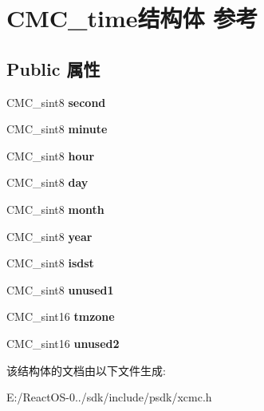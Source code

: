 \hypertarget{struct_c_m_c__time}{}\section{C\+M\+C\+\_\+time结构体 参考}
\label{struct_c_m_c__time}
\subsection*{Public 属性}
\begin{DoxyCompactItemize}
\item 
\mbox{\label{struct_c_m_c__time_a3b2881d4b17c154fc42d52ad544f2dbe}} 
C\+M\+C\+\_\+sint8 {\bfseries second}
\item 
\mbox{\label{struct_c_m_c__time_a6565d5de6fb130d1ce5793fbc7c0c451}} 
C\+M\+C\+\_\+sint8 {\bfseries minute}
\item 
\mbox{\label{struct_c_m_c__time_a098f3dc4fba997bd1a786d8249bf8774}} 
C\+M\+C\+\_\+sint8 {\bfseries hour}
\item 
\mbox{\label{struct_c_m_c__time_ae93122512c4fcf030e975e47f082e62d}} 
C\+M\+C\+\_\+sint8 {\bfseries day}
\item 
\mbox{\label{struct_c_m_c__time_a7c3c6499632a626b59a305f48db71efd}} 
C\+M\+C\+\_\+sint8 {\bfseries month}
\item 
\mbox{\label{struct_c_m_c__time_a14fb02641a97c118ffb8f1c591fadfb8}} 
C\+M\+C\+\_\+sint8 {\bfseries year}
\item 
\mbox{\label{struct_c_m_c__time_abfc7924bc699a87cbfff6e31bb81a106}} 
C\+M\+C\+\_\+sint8 {\bfseries isdst}
\item 
\mbox{\label{struct_c_m_c__time_a2220e30210638fc98f50ec4b8d29954f}} 
C\+M\+C\+\_\+sint8 {\bfseries unused1}
\item 
\mbox{\label{struct_c_m_c__time_af6abde3623adea219dcb306d7aaa271c}} 
C\+M\+C\+\_\+sint16 {\bfseries tmzone}
\item 
\mbox{\label{struct_c_m_c__time_a07f98196c3c727f4413de302b5ba8fdb}} 
C\+M\+C\+\_\+sint16 {\bfseries unused2}
\end{DoxyCompactItemize}


该结构体的文档由以下文件生成\+:\begin{DoxyCompactItemize}
\item 
E\+:/\+React\+O\+S-\/0../sdk/include/psdk/xcmc.\+h\end{DoxyCompactItemize}
